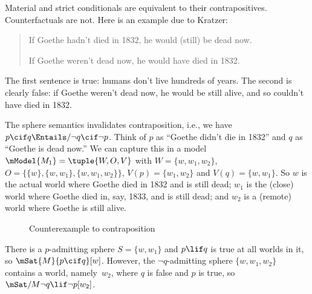 \documentclass[../../../include/open-logic-section]{subfiles}
\begin{document}

Material and strict conditionals are equivalent to their
contrapositives. Counterfactuals are not.  Here is an example due to
Kratzer:
\begin{quote}
  If Goethe hadn't died in 1832, he would (still) be dead now.

  If Goethe weren't dead now, he would have died in 1832.
\end{quote}
The first sentence is true: humans don't live hundreds of years.  The
second is clearly false: if Goethe weren't dead now, he would be still
alive, and so couldn't have died in 1832.

\begin{ex}
  The sphere semantics invalidates contraposition, i.e., we have $p
  \cif q \Entails/ \lnot q \cif \lnot p$. Think of $p$ as ``Goethe
  didn't die in 1832'' and $q$ as ``Goethe is dead now.'' We can
  capture this in a model $\mModel{M_1} = \tuple{W, O, V}$ with $W =
  \{w, w_1, w_2\}$, $O = \{\{w\}, \{w, w_1\}, \{w, w_1, w_2\}\}$,
  $V(p) = \{w_1, w_2\}$ and $V(q) = \{w, w_1\}$. So $w$ is the actual
  world where Goethe died in 1832 and is still dead; $w_1$ is the
  (close) world where Goethe died in, say, 1833, and is still dead;
  and $w_2$ is a (remote) world where Goethe is still alive.
\begin{figure}
\centering
{}
\caption{Counterexample to contraposition}
\end{figure}
There is a $p$-admitting sphere $S =
\{w, w_1\}$ and $p \lif q$ is true at all worlds in it, so $\mSat{M}{p
  \cif q}[w]$. However, the $\lnot q$-admitting sphere $\{w, w_1,
w_2\}$ contains a world, namely~$w_2$, where $q$ is false and $p$ is
true, so $\mSat/{M}{\lnot q \lif \lnot p}[w_2]$.
\end{ex}
\end{document}
